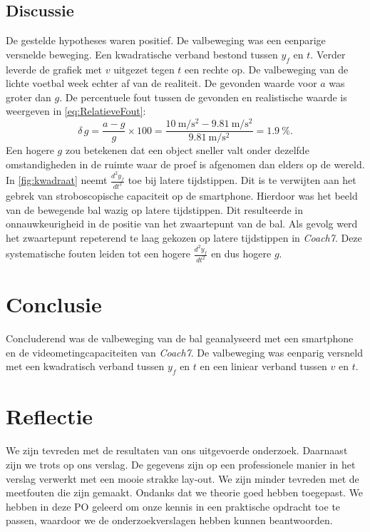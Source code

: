 \documentclass[•]{scrartcl}
\begin{document}
\subsection{Discussie}
De gestelde hypotheses waren positief. De valbeweging was een eenparige versnelde beweging. Een kwadratische verband bestond tussen $y_f$ en $t$. Verder leverde de grafiek met $v$ uitgezet tegen $t$ een rechte op. De valbeweging van de lichte voetbal week echter af van de realiteit. De gevonden waarde voor $a$ was groter dan $g$. De percentuele fout tussen de gevonden en realistische waarde is weergeven in \cref{eq:RelatieveFout}:
\begin{equation}\label{eq:RelatieveFout}
\delta \, g=\frac{a-g}{g}\times 100= \frac{\SI{10}{\meter\per\second\squared}-\SI{9.81}{\meter\per\second\squared}}{\SI{9.81}{\meter\per\second\squared}}=\SI{1.9}{\percent}\mathrm{.}
\end{equation}
Een hogere $g$ zou betekenen dat een object sneller valt onder dezelfde omstandigheden in de ruimte waar de proef is afgenomen dan elders op de wereld. In \cref{fig:kwadraat} neemt $\frac{d^2y_f}{dt^2}$ toe bij latere tijdstippen. Dit is te verwijten aan het gebrek van stroboscopische capaciteit op de smartphone. Hierdoor was het beeld van de bewegende bal wazig op latere tijdstippen. Dit resulteerde in onnauwkeurigheid in de positie van het zwaartepunt van de bal. Als gevolg werd het zwaartepunt repeterend te laag gekozen op latere tijdstippen in \textit{Coach7}. Deze systematische fouten leiden tot een hogere $\frac{d^2y_f}{dt^2}$ en dus hogere $g$.
%
\section{Conclusie}
Concluderend was de valbeweging van de bal geanalyseerd met een smartphone en de videometingcapaciteiten van \textit{Coach7}. De valbeweging was eenparig versneld met een kwadratisch verband tussen $y_f$ en $t$ en een liniear verband tussen $v$ en $t$. 
\section{Reflectie}	
We zijn tevreden met de resultaten van ons uitgevoerde onderzoek. Daarnaast zijn we trots op ons verslag. De gegevens zijn op een professionele manier in het verslag verwerkt met een mooie strakke lay-out. We zijn minder tevreden met de meetfouten die zijn gemaakt. Ondanks dat we theorie goed hebben toegepast. We hebben in deze PO geleerd om onze kennis in een praktische opdracht toe te passen, waardoor we de onderzoekverslagen hebben kunnen beantwoorden.
\newpage
\appendix
\end{document}
